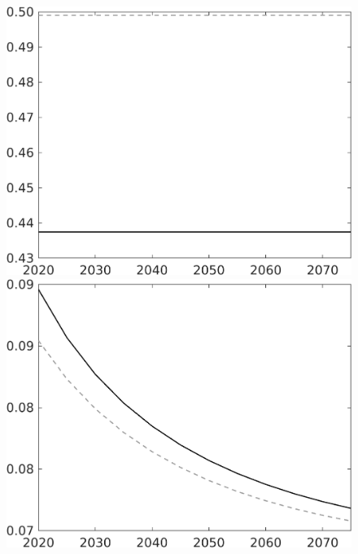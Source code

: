 \begin{figure}[h!!]
\begin{minipage}[]{0.32\textwidth}
	\end{minipage}	
	\begin{minipage}[]{0.32\textwidth}
		\includegraphics[width=1\textwidth]{../../codding_model/own_basedOnFried/optimalPol_010922_revision/figures/all_13Sept22/CompTaul_LFBAU_Reg0_hh_spillover0_nsk0_xgr0_sep1_countec0_GovRev1_etaa0.79_lgd0.png}
	\end{minipage}	
	\begin{minipage}[]{0.32\textwidth}
		\includegraphics[width=1\textwidth]{../../codding_model/own_basedOnFried/optimalPol_010922_revision/figures/all_13Sept22/CompTaul_LFBAU_Reg0_sff_spillover0_nsk0_xgr0_sep1_countec0_GovRev1_etaa0.79_lgd0.png}

\end{minipage}
\end{figure}

